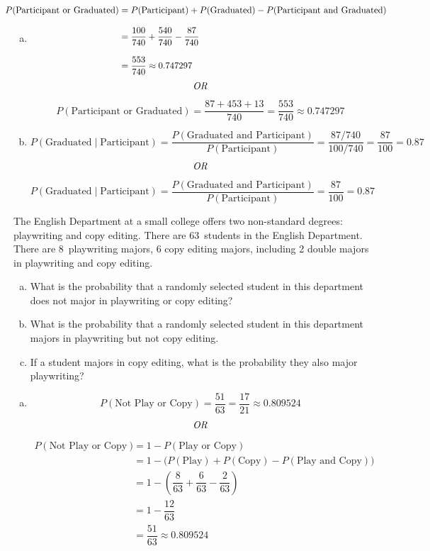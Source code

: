 \documentclass[12pt,letterpaper]{exam}
\begin{document}
\begin{questions}
{\begin{enumerate}[(a)]
\item 
	\[
	\begin{aligned}
	\hspace{-1cm} P(\text{Participant or Graduated})&= P(\text{Participant}) + P(\text{Graduated}) - P(\text{Participant and Graduated}) \\[0.3cm]
	\hspace{-1cm}&= \dfrac{100}{740} + \dfrac{540}{740} - \dfrac{87}{740} \\[0.3cm]
	\hspace{-1cm}&= \dfrac{553}{740} \approx 0.747297
	\end{aligned}
	\]  \pvspace{0.1cm}
	\[ \text{\itshape OR} \] \pvspace{0.1cm}
	\[
	P(\text{Participant or Graduated})= \dfrac{87 + 453 + 13}{740}= \dfrac{553}{740} \approx 0.747297
	\] \pspace

\item 
	\[
	P(\text{Graduated} \;|\; \text{Participant})= \dfrac{P(\text{Graduated and Participant})}{P(\text{Participant})}= \dfrac{87/740}{100/740}= \dfrac{87}{100}= 0.87
	\] \pvspace{0.1cm}
	\[ \text{\itshape OR} \] \pvspace{0.1cm}
	\[
	P(\text{Graduated} \;|\; \text{Participant})= \dfrac{P(\text{Graduated and Participant})}{P(\text{Participant})}= \dfrac{87}{100}= 0.87
	\]
\end{enumerate}
}



\newpage
\question[10] The English Department at a small college offers two non-standard degrees: playwriting and copy editing. There are 63~students in the English Department. There are 8~playwriting majors, 6 copy editing majors, including 2 double majors in playwriting and copy editing. 
	\begin{enumerate}[(a)]
	\item What is the probability that a randomly selected student in this department does not major in playwriting or copy editing?
	\item What is the probability that a randomly selected student in this department majors in playwriting but not copy editing. 
	\item If a student majors in copy editing, what is the probability they also major playwriting?
	\end{enumerate} 

{\itshape
\sol 
\begin{enumerate}[(a)]
\item 
	\[
	P(\text{Not Play or Copy})= \dfrac{51}{63}= \dfrac{17}{21} \approx 0.809524
	\] 
	\[ \text{\itshape OR} \]
	\[
	\begin{aligned}
	P(\text{Not Play or Copy})&= 1 - P(\text{Play or Copy}) \\[0.3cm]
	&= 1 - \big( P(\text{Play}) + P(\text{Copy}) - P(\text{Play and Copy}) \big) \\[0.3cm]
	&= 1 - \left( \dfrac{8}{63} + \dfrac{6}{63} - \dfrac{2}{63} \right) \\[0.3cm]
	&= 1 - \dfrac{12}{63} \\[0.3cm]
	&= \dfrac{51}{63} \approx 0.809524
	\end{aligned}
	\] \pspace


\end{enumerate}}
\end{questions}
\end{document}
